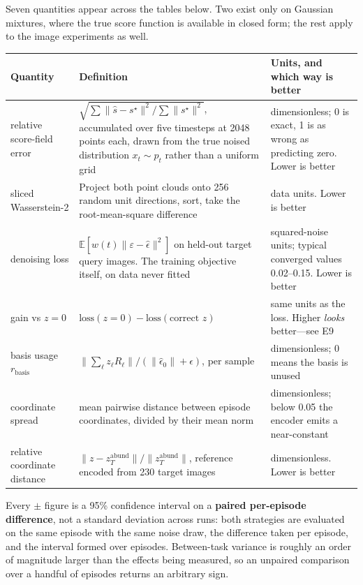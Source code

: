 \documentclass[11pt]{article}
\newcommand{\epshat}{\hat{\epsilon}}
\begin{document}
Seven quantities appear across the tables below. Two exist only on Gaussian mixtures, where the
true score function is available in closed form; the rest apply to the image experiments as well.

\begin{table}[htbp]
\centering\small
\begin{tabular}{@{}p{3.1cm}p{6.3cm}p{4.6cm}@{}}
\toprule
\textbf{Quantity} & \textbf{Definition} & \textbf{Units, and which way is better} \\
\midrule
relative score-field error
  & $\sqrt{\sum\|\hat{s}-s^{\star}\|^2 \big/ \sum\|s^{\star}\|^2}$, accumulated over five
    timesteps at 2048 points each, drawn from the true noised distribution $x_t\sim p_t$ rather
    than a uniform grid
  & dimensionless; 0 is exact, 1 is as wrong as predicting zero. Lower is better \\[2pt]
sliced Wasserstein-2
  & Project both point clouds onto 256 random unit directions, sort, take the root-mean-square
    difference
  & data units. Lower is better \\[2pt]
denoising loss
  & $\mathbb{E}[w(t)\|\varepsilon-\epshat\|^2]$ on held-out target query images. The training
    objective itself, on data never fitted
  & squared-noise units; typical converged values 0.02--0.15. Lower is better \\[2pt]
gain vs $z=0$
  & $\text{loss}(z{=}0)-\text{loss}(\text{correct }z)$
  & same units as the loss. Higher \emph{looks} better---see E9 \\[2pt]
basis usage $r_{\text{basis}}$
  & $\|\sum_\ell z_\ell R_\ell\| / (\|\epshat_0\|+\epsilon)$, per sample
  & dimensionless; 0 means the basis is unused \\[2pt]
coordinate spread
  & mean pairwise distance between episode coordinates, divided by their mean norm
  & dimensionless; below 0.05 the encoder emits a near-constant \\[2pt]
relative coordinate distance
  & $\|z-z^{\text{abund}}_T\| / \|z^{\text{abund}}_T\|$, reference encoded from 230 target images
  & dimensionless. Lower is better \\
\bottomrule
\end{tabular}
\end{table}

Every $\pm$ figure is a 95\% confidence interval on a \textbf{paired per-episode difference}, not a
standard deviation across runs: both strategies are evaluated on the same episode with the same
noise draw, the difference taken per episode, and the interval formed over episodes. Between-task
variance is roughly an order of magnitude larger than the effects being measured, so an unpaired
comparison over a handful of episodes returns an arbitrary sign.
\end{document}
